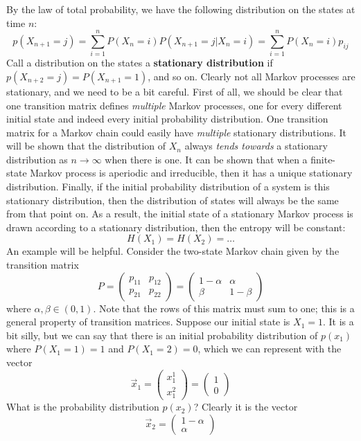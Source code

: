 By the law of total probability, we have the following distribution on the states at time $n$:
\[ p(X_{n+1} = j) = \sum_{i=1}^n P(X_n = i)P(X_{n+1}=j|X_n = i) = \sum_{i=1}^n P(X_n=i)p_{ij} \]
Call a distribution on the states a \textbf{stationary distribution} if $p(X_{n+2}=j) = P(X_{n+1}=1)$, and so on. Clearly not all Markov processes are stationary, and we need to be a bit careful. First of all, we should be clear that one transition matrix defines \emph{multiple} Markov processes, one for every different initial state and indeed every initial probability distribution. One transition matrix for a Markov chain could easily have \emph{multiple} stationary distributions. It will be shown that the distribution of $X_n$ always \textit{tends towards} a stationary distribution as $n \to \infty$ when there is one. It can be shown that when a finite-state Markov process is aperiodic and irreducible, then it has a unique stationary distribution. Finally, if the initial probability distribution of a system is this stationary distribution, then the distribution of states will always be the same from that point on. As a result, the initial state of a stationary Markov process is drawn according to a stationary distribution, then the entropy will be constant:
\[ H(X_1) = H(X_2) = \ldots \] 
An example will be helpful. Consider the two-state Markov chain given by the transition matrix
\[ P = \begin{pmatrix} p_{11} & p_{12} \\ p_{21} & p_{22} \end{pmatrix} =  \begin{pmatrix} 1-\alpha & \alpha \\
						\beta & 1-\beta \end{pmatrix} \]  
	where $\alpha,\beta \in (0,1)$. Note that the rows of this matrix must sum to one; this is a general property of transition matrices. Suppose our initial state is $X_1 = 1$. It is a bit silly, but we can say that there is an initial probability distribution of $p(x_1)$ where $P(X_1 = 1) = 1$ and $P(X_1 = 2) = 0$, which we can represent with the vector
\[ \vec{x}_1 = \begin{pmatrix} x_1^1 \\ x_1^2 \end{pmatrix} = \begin{pmatrix} 1 \\ 0 \end{pmatrix} \]
What is the probability distribution $p(x_2)$? Clearly it is the vector
\[ \vec{x}_2 = \begin{pmatrix} 1-\alpha \\ \alpha \end{pmatrix} \] 
